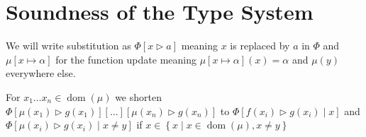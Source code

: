 \documentclass[twoside, english]{sdqthesis}
\newcommand{\set}[1]{\left\{ #1 \right\}}
\newcommand{\tr}[0]{\triangleright}
\DeclareMathOperator{\dom}{dom}
\theoremstyle{definition}
\begin{document}


\section{Soundness of the Type System}\label{sec:soundness}

We will write substitution as $\Phi[ x \tr a ]$ meaning $x$ is replaced by $a$ in $\Phi$ and $\mu[x \mapsto \alpha]$ for the function update meaning $\mu[x \mapsto \alpha](x) = \alpha$ and $\mu(y)$ everywhere else.

For $x_1 \dots x_n \in \dom(\mu)$ 
we shorten $\Phi[\mu(x_1) \tr g(x_1)][\dots][\mu(x_n) \tr g(x_n)]$ to $\Phi[f(x_i) \tr g(x_i) \mid x]$ and $\Phi[\mu(x_i) \tr g(x_i) \mid x \neq y]$ if $x \in \set{ x \mid x \in \dom(\mu), x \neq y }$
\end{document}
